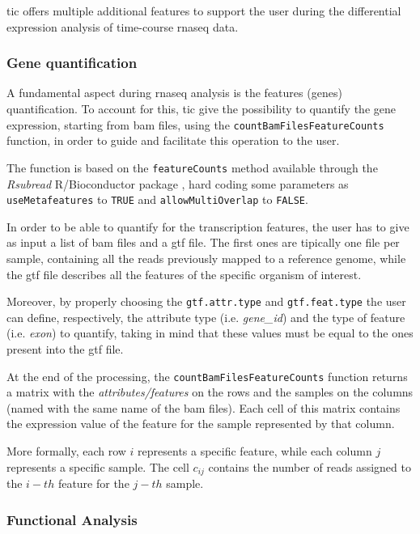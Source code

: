 \gls{tic} offers multiple additional features to support the user during the differential expression analysis of time-course \gls{rnaseq} data.

\subsubsection{Gene quantification}

A fundamental aspect during \gls{rnaseq} analysis is the features (genes) quantification.
To account for this, \gls{tic} give the possibility to quantify the gene expression, starting from \gls{bam} files, using the \lstinline!countBamFilesFeatureCounts! function, in order to guide and facilitate this operation to the user.

The function is based on the \lstinline!featureCounts! method available through the \textit{Rsubread} R/Bioconductor package \cite{Liao2013}, hard coding some parameters as \lstinline!useMetafeatures! to \lstinline!TRUE! and \lstinline!allowMultiOverlap! to \lstinline!FALSE!.

In order to be able to quantify for the transcription features, the user has to give as input a list of \gls{bam} files and a \gls{gtf} file.
The first ones are tipically one file per sample, containing all the reads previously mapped to a reference genome, while the \gls{gtf} file describes all the features of the specific organism of interest. 

Moreover, by properly choosing  the \lstinline!gtf.attr.type! and \lstinline!gtf.feat.type! the user can define, respectively, the attribute type (i.e. \textit{gene\_id}) and the type of feature (i.e. \textit{exon}) to quantify, taking in mind that these values must be equal to the ones present into the \gls{gtf} file.

At the end of the processing, the \lstinline!countBamFilesFeatureCounts! function returns a matrix with the \textit{attributes/features} on the rows and the samples  on the columns (named with the same name of the \gls{bam} files).
Each cell of this matrix contains the expression value of the feature for the sample represented by that column.

More formally, each row $i$ represents a specific feature, while each column $j$ represents a specific sample.
The cell $c_{ij}$ contains the number of reads assigned to the $i-th$ feature for the $j-th$ sample.

\subsubsection{Functional Analysis}

